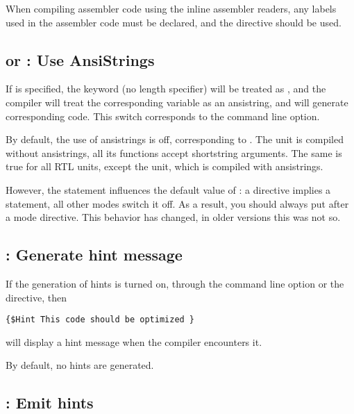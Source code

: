 \begin{remark}When compiling assembler code using the inline assembler
readers, any labels used in the assembler code must be declared, and 
the  directive should be used.
\end{remark}

\subsection{ or  : Use AnsiStrings}

If  is specified, the keyword  (no
length specifier) will be treated as , and the compiler
will treat the corresponding variable as an ansistring, and will
generate corresponding code. This switch corresponds to the 
command line option.

By default, the use of ansistrings is off, corresponding to .
The  unit is compiled without ansistrings, all its functions accept
shortstring arguments. The same is true for all RTL units, except the
 unit, which is compiled with ansistrings.

However, the  statement influences the default value of
: a  directive implies a
 statement, all other modes switch it off. As a result,
you should always put  after a mode directive. 
This behavior has changed, in older \fpc versions this was not so. 

\subsection{ : Generate hint message}

If the generation of hints is turned on, through the  command line
option or the  directive, then
\begin{verbatim}
{$Hint This code should be optimized }
\end{verbatim}
will display a hint message when the compiler encounters it.

By default, no hints are generated.

\subsection{ : Emit hints}

